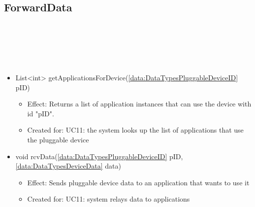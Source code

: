   \subsection{ForwardData}\label{int:OnlineServiceApplicationManagerForwardData}
    \begin{description}
      \item[Provided by:] \iconcomponent{}~
      \item[Required by:] \iconcomponent{}~
      \item[Operations:] ~
    \begin{itemize}[noitemsep,nolistsep,leftmargin=-.25cm]
      \item \textsf{List\textless{}int\textgreater{} getApplicationsForDevice(\ref{data:DataTypesPluggableDeviceID} pID)}
        \begin{itemize}[noitemsep,nolistsep]
           \item Effect: Returns a list of application instances that can use the device with id "pID". \\
\item Created for: UC11: the system looks up the list of applications that use the pluggable device
        \end{itemize}
      \item \textsf{void rcvData(\ref{data:DataTypesPluggableDeviceID} pID, \ref{data:DataTypesDeviceData} data)}
        \begin{itemize}[noitemsep,nolistsep]
           \item Effect: Sends pluggable device data to an application that wants to use it \\
\item Created for: UC11: system relays data to applications
        \end{itemize}
    \end{itemize}
    \end{description}

